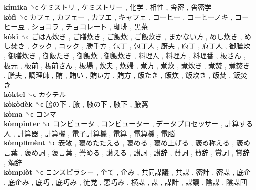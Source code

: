 \textbf{kímika} ␝ϲ   ケミストリ ,  ケミストリー ,  化学 ,  相性 ,  舎密 ,  舎密学   \\
\textbf{kòfi} ␝ϲ   カフェ ,  カフェー ,  カフエ ,  キャフェ ,  コーヒー ,  コーヒーノキ ,  コーヒー豆 ,  ショコラ ,  チョコレート ,  珈琲 ,  黒茶   \\
\textbf{kòki} ␝ϲ   ごはん炊き ,  ご膳炊き ,  ご飯炊 ,  ご飯炊き ,  まかない方 ,  めし炊き ,  めし焚き ,  クック ,  コック ,  勝手方 ,  包丁 ,  包丁人 ,  厨夫 ,  庖丁 ,  庖丁人 ,  御膳炊 ,  御膳炊き ,  御飯たき ,  御飯炊 ,  御飯炊き ,  料理人 ,  料理方 ,  料理番 ,  板さん ,  板元 ,  板前 ,  板前さん ,  板場 ,  炊夫 ,  炊婦 ,  煮方 ,  煮炊 ,  煮炊き ,  煮焚 ,  煮焚き ,  膳夫 ,  調理師 ,  賄 ,  賄い ,  賄い方 ,  賄方 ,  飯たき ,  飯炊 ,  飯炊き ,  飯焚 ,  飯焚き   \\
\textbf{kòktel} ␝ϲ   カクテル   \\
\textbf{kòkòdèk} ␝ϲ   脇の下 ,  腋 ,  腋の下 ,  腋下 ,  腋窩   \\
\textbf{kòma} ␝ϲ   コンマ   \\
\textbf{kòmpiuter} ␝ϲ   コンピュータ ,  コンピューター ,  データプロセッサー ,  計算する人 ,  計算器 ,  計算機 ,  電子計算機 ,  電算 ,  電算機 ,  電脳   \\
\textbf{kòmplimènt} ␝ϲ   表敬 ,  褒めたたえる ,  褒める ,  褒め上げる ,  褒め称える ,  褒め言葉 ,  褒め詞 ,  褒言葉 ,  誉める ,  讃える ,  讃詞 ,  讃辞 ,  賛詞 ,  賛辞 ,  賞詞 ,  賞辞 ,  頌辞   \\
\textbf{kòmplòt} ␝ϲ   コンスピラシー ,  企て ,  企み ,  共同謀議 ,  共謀 ,  密計 ,  密謀 ,  底企 ,  底企み ,  底巧 ,  底巧み ,  徒党 ,  悪巧み ,  横謀 ,  謀 ,  謀計 ,  謀議 ,  陰謀 ,  陰謀団   \\
